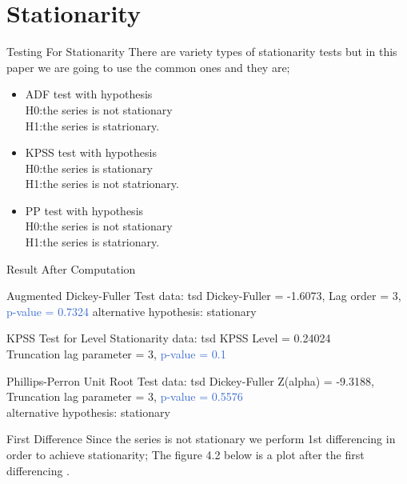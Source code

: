 \documentclass{beamer}
\begin{document}
	\section{Stationarity}
	\begin{frame}{Testing For Stationarity}
		There are variety types of stationarity tests but in this paper we are going to use the common ones and they are;
		
		\begin{itemize}
			\item ADF test with hypothesis \\
			H0:the series is not stationary \\
			H1:the series is statrionary. \vspace{5pt}
			
			\item KPSS test with hypothesis \\
			H0:the series is stationary \\
			H1:the series is not statrionary. \vspace{5pt}
			
			\item PP test with hypothesis \\
			H0:the series is not stationary \\
			H1:the series is statrionary. \\
		\end{itemize}
	\end{frame}

	\begin{frame}{Result After Computation}
			\begin{block}{Augmented Dickey-Fuller Test}
				data: tsd Dickey-Fuller = -1.6073, Lag order = 3, \\
				\textcolor{\highlight}{p-value = 0.7324} alternative hypothesis: stationary \vspace{5pt}
			\end{block} \pause
			
			\begin{alertblock}{KPSS Test for Level Stationarity}
				data: tsd KPSS Level = 0.24024 \\
				Truncation lag parameter = 3, \textcolor{\highlight}{p-value = 0.1} \vspace{5pt}
			\end{alertblock} \pause
			
			\begin{exampleblock}{Phillips-Perron Unit Root Test}
				data: tsd Dickey-Fuller Z(alpha) = -9.3188, \\
				Truncation lag parameter = 3, \textcolor{\highlight}{p-value = 0.5576} \\
				alternative hypothesis: stationary
			\end{exampleblock}
	\end{frame}
	
	\begin{frame}
		\begin{alertblock}{First Difference}
			\vspace{5pt}
			Since the series is not stationary we perform 1st differencing in order to achieve stationarity;
			The figure 4.2 below is a plot after the first differencing .
			\vspace{5pt}
		\end{alertblock}
	\end{frame}
	
\end{document}
